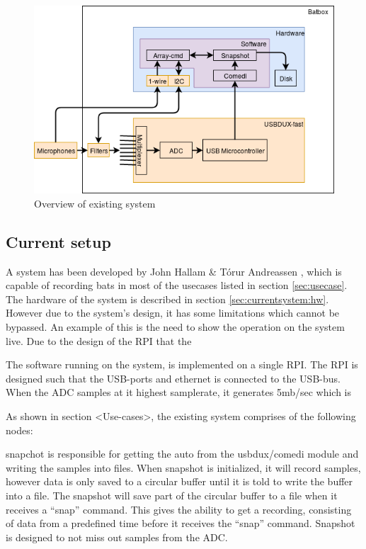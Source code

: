 \begin{figure}[h!]
	\centering
	\includegraphics[width=1\textwidth]{figures/existing-system-overview.png} 
	\caption{Overview of existing system}\label{fig:existingsystem:overview}
\end{figure}



\subsection{Current setup}

A system has been developed by John Hallam \& T{\'o}rur Andreassen \citep{andreassen2013ultrasonic}, which is capable of recording bats in most of the usecases listed in section \ref{sec:usecase}. The hardware of the system is described in section \ref{sec:currentsystem:hw}. 
However due to the system's design, it has some limitations which cannot be bypassed. An example of this is the need to show the operation on the system live. Due to the design of the RPI that the 

The software running on the system, is implemented on a single RPI. The RPI is designed such that the USB-ports and ethernet is connected to the USB-bus. When the ADC samples at it highest samplerate, it generates 5mb/sec which is 

As shown in section <Use-cases>, the existing system comprises of the following nodes:

snapchot is responsible for getting the auto from the usbdux/comedi module and writing the samples into files. When snapshot is initialized, it will record samples, however data is only saved to a circular buffer until it is told to write the buffer into a file. The snapshot will save part of the circular buffer to a file when it receives a “snap” command. This gives the ability to get a recording, consisting of data from a predefined time before it receives the “snap” command. Snapshot is designed to not miss out samples from the ADC.

